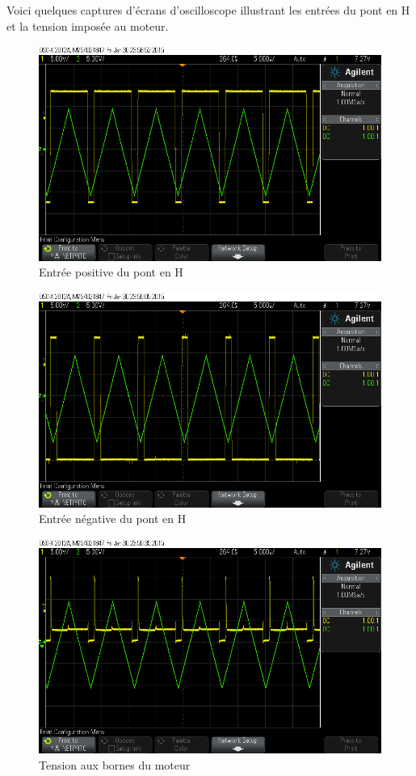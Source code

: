 \documentclass[a4paper]{article}
\begin{document}
Voici quelques captures d'écrans d'oscilloscope illustrant les entrées du pont en H et la tension imposée au moteur.

\begin{figure}[H]
  \centering
    \includegraphics[width=1\textwidth]{scope_1}
  \caption{Entrée positive du pont en H}
\end{figure}

\begin{figure}[H]
  \centering
    \includegraphics[width=1\textwidth]{scope_2}
  \caption{Entrée négative du pont en H}
\end{figure}

\begin{figure}[H]
  \centering
    \includegraphics[width=1\textwidth]{scope_3}
  \caption{Tension aux bornes du moteur}
\end{figure}
\end{document}
